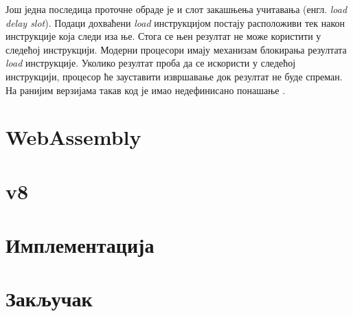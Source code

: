 \documentclass[12pt,oneside]{memoir}
\begin{document}
Још једна последица проточне обраде је и слот закашњења учитавања (енгл. \textit{load delay slot}). Подаци дохваћени
\textit{load} инструкцијом постају расположиви тек након инструкције која следи иза ње. Стога се њен резултат не
може користити у следећој инструкцији. Модерни процесори имају механизам блокирања резултата \textit{load}
инструкције. Уколико резултат проба да се искористи у следећој инструкцији, процесор ће зауставити извршавање док
резултат не буде спреман. На ранијим верзијама такав код је имао недефинисано понашање \cite{SMR}.


\chapter{WebAssembly}

\chapter{v8}

\chapter{Имплементација}

\chapter{Закључак}

\literatura

\backmatter
\end{document}
